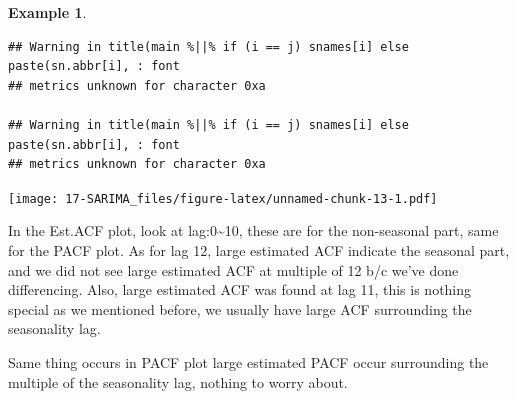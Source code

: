 \documentclass[
]{book}
\theoremstyle{definition}
\theoremstyle{definition}
\newtheorem{example}{Example}[chapter]
\theoremstyle{definition}
\theoremstyle{definition}
\theoremstyle{remark}
\begin{document}
\begin{example}
\begin{verbatim}
## Warning in title(main %||% if (i == j) snames[i] else paste(sn.abbr[i], : font
## metrics unknown for character 0xa

## Warning in title(main %||% if (i == j) snames[i] else paste(sn.abbr[i], : font
## metrics unknown for character 0xa
\end{verbatim}

\texttt{[image: 17-SARIMA\_files/figure-latex/unnamed-chunk-13-1.pdf]}

In the Est.ACF plot, look at lag:0\textasciitilde10, these are for the non-seasonal part, same for the PACF plot. As for lag 12, large estimated ACF indicate the seasonal part, and we did not see large estimated ACF at multiple of 12 b/c we've done differencing. Also, large estimated ACF was found at lag 11, this is nothing special as we mentioned before, we usually have large ACF surrounding the seasonality lag.

Same thing occurs in PACF plot large estimated PACF occur surrounding the multiple of the seasonality lag, nothing to worry about.


\end{example}
\end{document}
